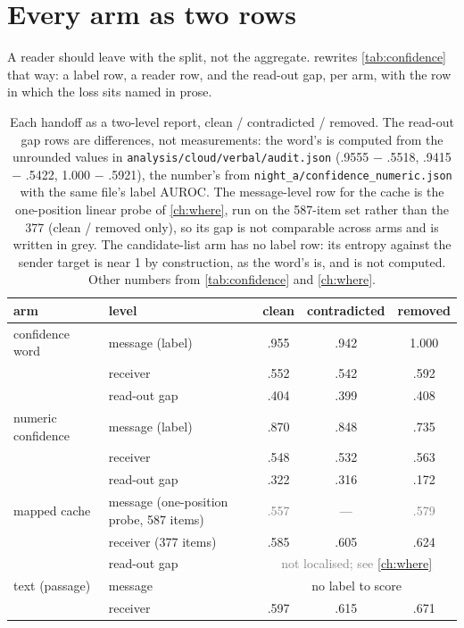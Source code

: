 \documentclass[11pt,a4paper]{report}
\begin{document}
\section{Every arm as two rows}

A reader should leave with the split, not the aggregate.  rewrites \cref{tab:confidence} that way: a label row, a reader row, and the read-out gap, per arm, with the row in which the loss sits named in prose.

\begin{table}[h]
\caption{Each handoff as a two-level report, clean / contradicted / removed. The read-out gap rows are differences, not measurements: the word's is computed from the unrounded values in \texttt{analysis/cloud/verbal/audit.json} (.9555 $-$ .5518, .9415 $-$ .5422, 1.000 $-$ .5921), the number's from \texttt{night\_a/confidence\_numeric.json} with the same file's label AUROC. The message-level row for the cache is the one-position linear probe of \cref{ch:where}, run on the 587-item set rather than the 377 (clean / removed only), so its gap is not comparable across arms and is written in grey. The candidate-list arm has no label row: its entropy against the sender target is near 1 by construction, as the word's is, and is not computed. Other numbers from \cref{tab:confidence} and \cref{ch:where}.}
\label{tab:tworows}
\vskip 0.1in
\centering
\small
\begin{tabular}{llccc}
\toprule
arm & level & clean & contradicted & removed \\
\midrule
confidence word & message (label) & .955 & .942 & 1.000 \\
                & receiver        & .552 & .542 & .592 \\
                & read-out gap    & .404 & .399 & .408 \\
\midrule
numeric confidence & message (label) & .870 & .848 & .735 \\
                   & receiver        & .548 & .532 & .563 \\
                   & read-out gap    & .322 & .316 & .172 \\
\midrule
mapped cache & message (one-position probe, 587 items) & \textcolor{gray}{.557} & --- & \textcolor{gray}{.579} \\
             & receiver (377 items)                     & .585 & .605 & .624 \\
             & read-out gap                             & \multicolumn{3}{c}{\textcolor{gray}{not localised; see \cref{ch:where}}} \\
\midrule
text (passage) & message & \multicolumn{3}{c}{no label to score} \\
               & receiver & .597 & .615 & .671 \\
\bottomrule
\end{tabular}
\end{table}
\end{document}
